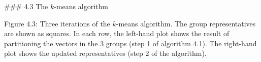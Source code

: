 

### 4.3 The \(k\)-means algorithm

Figure 4.3: Three iterations of the \(k\)-means algorithm. The group representatives are shown as squares. In each row, the left-hand plot shows the result of partitioning the vectors in the 3 groups (step 1 of algorithm 4.1). The right-hand plot shows the updated representatives (step 2 of the algorithm).

